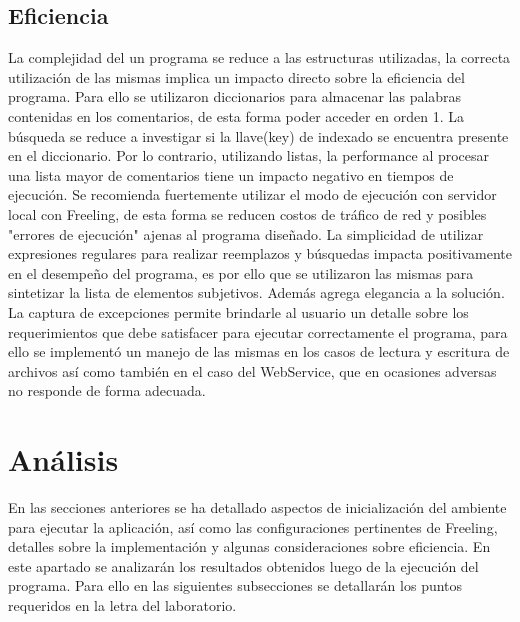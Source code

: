 \documentclass[12pt]{article}
\begin{document}
\subsection{Eficiencia}
La complejidad del un programa se reduce a las estructuras utilizadas, la correcta utilización de las mismas implica un impacto directo sobre la eficiencia del programa. Para ello se utilizaron diccionarios para almacenar las palabras contenidas en los comentarios, de esta forma poder acceder en orden 1. La búsqueda se reduce a investigar si la llave(key) de indexado se encuentra presente en el diccionario. Por lo contrario, utilizando listas, la performance al procesar una lista mayor de comentarios tiene un impacto negativo en tiempos de ejecución.
Se recomienda fuertemente utilizar el modo de ejecución con servidor local con Freeling, de esta forma se reducen costos de tráfico de red y posibles "errores de ejecución" ajenas al programa diseñado.
La simplicidad de utilizar expresiones regulares para realizar reemplazos y búsquedas impacta positivamente en el desempeño del programa, es por ello que se utilizaron las mismas para sintetizar la lista de elementos subjetivos. Además agrega elegancia a la solución.
La captura de excepciones permite brindarle al usuario un detalle sobre los requerimientos que debe satisfacer para ejecutar correctamente el programa, para ello se implementó un manejo de las mismas en los casos de lectura y escritura de archivos así como también en el caso del WebService, que en ocasiones adversas no responde de forma adecuada.


\section{Análisis}
En las secciones anteriores se ha detallado aspectos de inicialización del ambiente para ejecutar la aplicación, así como las configuraciones pertinentes de Freeling, detalles sobre la implementación y algunas consideraciones sobre eficiencia. En este apartado se analizarán los resultados obtenidos luego de la ejecución del programa. Para ello en las siguientes subsecciones se detallarán los puntos requeridos en la letra del laboratorio.
\end{document}
